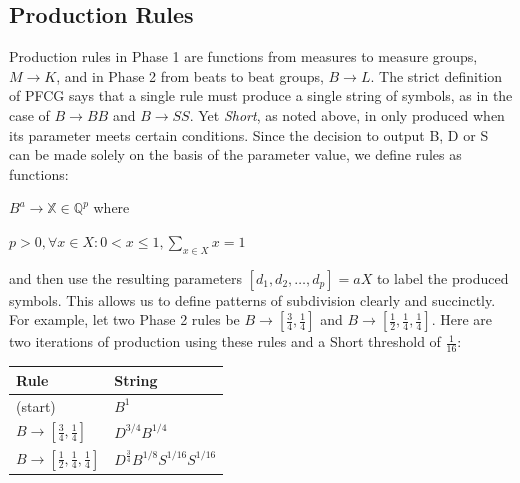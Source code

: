 \documentclass{article}
\begin{document}








\subsection{Production Rules}

Production rules in Phase 1 are functions from measures to measure groups, $M \rightarrow K$, and in Phase 2 from beats to beat groups, $B \rightarrow L$. The strict definition of PFCG says that a single rule must produce a single string of symbols, as in the case of $B \rightarrow BB$ and $B \rightarrow SS$.  Yet \emph{Short}, as noted above, in only produced when its parameter meets certain conditions. Since the decision to output B, D or S can be made solely on the basis of the parameter value, we define rules as functions:

$B^a \rightarrow \mathbb{X} \in \mathbb{Q}^{p}$ where 

$p > 0 , \forall x \in X: 0 < x \leq 1, \sum_{x \in X} x = 1$

and then use the resulting parameters $[d_1,d_2,…,d_p]=aX$ to label the produced symbols. This allows us to define patterns of subdivision clearly and succinctly. For example, let two Phase 2 rules be $B \rightarrow [\frac{3}{4}, \frac{1}{4}]$ and $B \rightarrow [\frac{1}{2}, \frac{1}{4}, \frac{1}{4}]$. Here are two iterations of production using these rules and a Short threshold of $\frac{1}{16}$:

\bgroup
\def\arraystretch{1.5}
\begin{center}
\begin{tabular}{ l l }
 Rule & String \\
 \hline
 (start)                                                  & $B^{1}$ \\
 $B \rightarrow [\frac{3}{4}, \frac{1}{4}]$               & $D^{3/4} B^{1/4}$ \\
 $B \rightarrow [\frac{1}{2}, \frac{1}{4}, \frac{1}{4}]$  & $D^{\frac{3}{4}} B^{1/8} S^{1/16} S^{1/16}$ \\
\end{tabular}
\end{center}
\egroup
\end{document}

